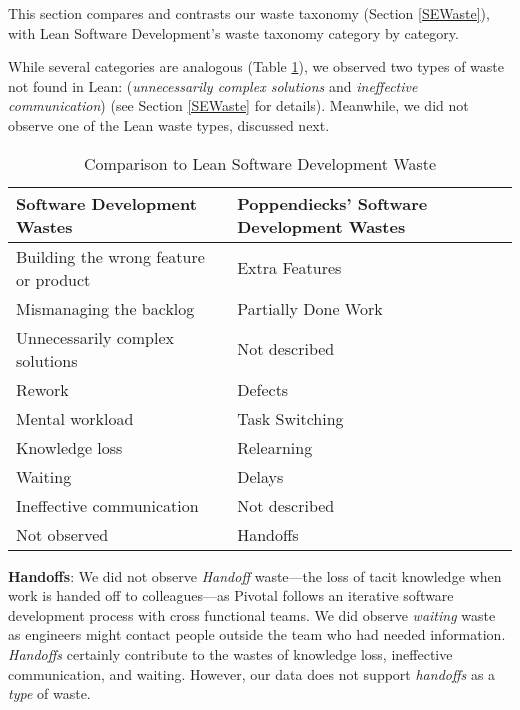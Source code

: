 This section compares and contrasts our waste taxonomy (Section \ref{SEWaste}), with Lean Software Development's waste taxonomy \cite{PoppendieckConceptToCash} category by category. 

While several categories are analogous (Table \ref{LeanSoftwareDevelopmentComparisonTable}), we observed two types of waste not found in Lean: (\textit{unnecessarily complex solutions} and \textit{ineffective communication}) (see Section \ref{SEWaste} for details). Meanwhile, we did not observe one of the Lean waste types, discussed next.

\begin{table}[t]
\renewcommand{\arraystretch}{1.5}
\centering
\caption{Comparison to Lean Software Development Waste}
\label{LeanSoftwareDevelopmentComparisonTable}
\begin{tabular}{|p{1.57in}|p{1.57in}|}
\hline
Software Development Wastes           & Poppendiecks' Software Development Wastes \\ \hline
Building the wrong feature or product & Extra Features                            \\ \hline
Mismanaging the backlog               & Partially Done Work                            \\ \hline
Unnecessarily complex solutions                & Not described                             \\ \hline
Rework                                & Defects                                   \\ \hline
Mental workload                 & Task Switching  \\ \hline
Knowledge loss                 & Relearning                            \\ \hline
Waiting                               & Delays                                    \\ \hline
Ineffective communication             & Not described                             \\ \hline
Not observed                          & Handoffs                                  \\ \hline
\end{tabular}
\end{table}

\textbf{Handoffs}: We did not observe \textit{Handoff} waste---the loss of tacit knowledge when work is handed off to colleagues---as Pivotal follows an iterative software development process with cross functional teams. We did observe \textit{waiting} waste as engineers might contact people outside the team who had needed information. \textit{Handoffs} certainly contribute to the wastes of knowledge loss, ineffective communication, and waiting. However, our data does not support \textit{handoffs} as a \textit{type} of waste.

